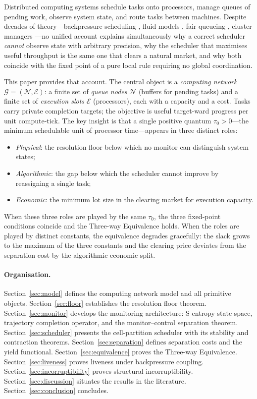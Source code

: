 \documentclass[11pt,twocolumn,a4paper]{article}
\theoremstyle{plain}
\theoremstyle{definition}
\theoremstyle{remark}
\newcommand{\N}{\mathcal{N}}
\newcommand{\E}{\mathcal{E}}
\newcommand{\G}{\mathcal{G}}
\newcommand{\tick}{\tau_0}
\begin{document}
Distributed computing systems schedule tasks onto processors, manage queues of pending work, observe system state, and route tasks between machines. Despite decades of theory---backpressure scheduling \cite{tassiulas1992}, fluid models \cite{neely2010}, fair queueing \cite{demers1990}, cluster managers \cite{hindman2011,verma2015}---no unified account explains simultaneously why a correct scheduler \emph{cannot} observe state with arbitrary precision, why the scheduler that maximises useful throughput is the same one that clears a natural market, and why both coincide with the fixed point of a pure local rule requiring no global coordination.

This paper provides that account. The central object is a \emph{computing network} $\G = (\N, \E)$: a finite set of \emph{queue nodes} $\N$ (buffers for pending tasks) and a finite set of \emph{execution slots} $\E$ (processors), each with a capacity and a cost. Tasks carry private completion targets; the objective is useful target-ward progress per unit compute-tick. The key insight is that a single positive quantum $\tick > 0$---the minimum schedulable unit of processor time---appears in three distinct roles:
\begin{itemize}[nosep]
\item \emph{Physical}: the resolution floor below which no monitor can distinguish system states;
\item \emph{Algorithmic}: the gap below which the scheduler cannot improve by reassigning a single task;
\item \emph{Economic}: the minimum lot size in the clearing market for execution capacity.
\end{itemize}

When these three roles are played by the same $\tick$, the three fixed-point conditions coincide and the Three-way Equivalence holds. When the roles are played by distinct constants, the equivalence degrades gracefully: the slack grows to the maximum of the three constants and the clearing price deviates from the separation cost by the algorithmic-economic split.

\paragraph{Organisation.} Section~\ref{sec:model} defines the computing network model and all primitive objects. Section~\ref{sec:floor} establishes the resolution floor theorem. Section~\ref{sec:monitor} develops the monitoring architecture: S-entropy state space, trajectory completion operator, and the monitor--control separation theorem. Section~\ref{sec:scheduler} presents the cell-partition scheduler with its stability and contraction theorems. Section~\ref{sec:separation} defines separation costs and the yield functional. Section~\ref{sec:equivalence} proves the Three-way Equivalence. Section~\ref{sec:liveness} proves liveness under backpressure coupling. Section~\ref{sec:incorruptibility} proves structural incorruptibility. Section~\ref{sec:discussion} situates the results in the literature. Section~\ref{sec:conclusion} concludes.
\end{document}
